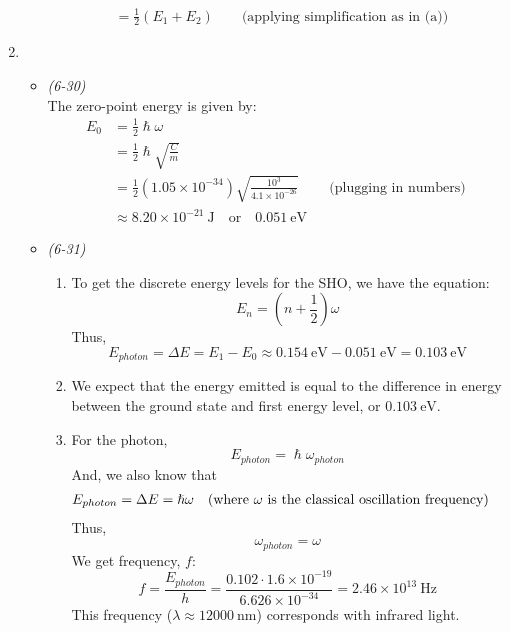\documentclass[10pt]{article}
\begin{document}
\begin{enumerate}
\begin{enumerate}
\begin{align*}
        &= \frac{1}{2}\left( E_1+E_2 \right) \qquad \text{(applying simplification as in (a))}
        \end{align*}
    \end{enumerate}
  \item 
  \begin{itemize}
    \item
      \textit{(6-30)} \\
      The zero-point energy is given by:
      \begin{align*}
        E_0&=\frac{1}{2} \hslash \omega \\
           &= \frac{1}{2}\hslash \sqrt{\frac{C}{m}} \\
           &= \frac{1}{2} \left( 1.05 \times 10 ^ {-34} \right) \sqrt{\frac{10^3}{4.1 \times 10^{-26}}} && \text{(plugging in numbers)} \\
           &\approx 8.20 \times 10 ^{-21}~\text{J} \quad \text{or} \quad 0.051~\text{eV}
      \end{align*}
    \item 
      \textit{(6-31)}
      \begin{enumerate}
      \item To get the discrete energy levels for the SHO, we have the equation:
        \begin{equation*}
          E_n=\left( n+\frac{1}{2} \right)\omega
        \end{equation*}
        Thus,
        \begin{equation*}
          E_{photon} = \Delta E = E_1-E_0 \approx 0.154~\text{eV} - 0.051~\text{eV} = 0.103~\text{eV}
        \end{equation*}
      \item We expect that the energy emitted is equal to the difference in energy between the ground state and first energy level, or $ 0.103~\text{eV} $.
      \item 
        For the photon,
        \begin{equation*}
          E_{photon} = \hslash \omega_{photon}
        \end{equation*}
        And, we also know that
        \begin{align*}
          &E_{photon} = \Delta E = \hslash \omega && \text{(where $ \omega $ is the classical oscillation frequency)}
        \end{align*}
        Thus,
        \begin{equation*}
          \omega_{photon} = \omega
        \end{equation*}
        We get frequency, $ f $:
        \begin{equation*}
          f = \frac{E_{photon}}{h} = \frac{0.102 \cdot 1.6 \times 10^{-19}}{6.626 \times 10^{-34}} = 2.46 \times 10^{13}~\text{Hz}
        \end{equation*}
        This frequency ($ \lambda \approx 12000~\text{nm} $) corresponds with infrared light.
      \end{enumerate}
  \end{itemize}
\end{enumerate}
\end{document}
